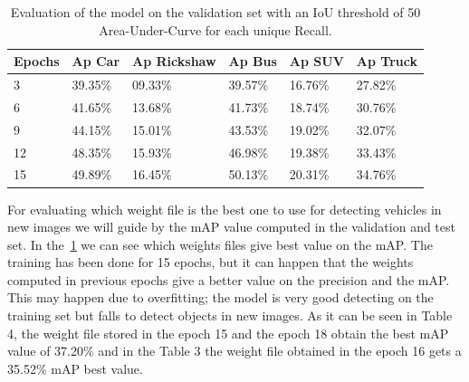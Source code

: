 \begin{table}[!h]
  \centering
  \caption[Evaluation of the model]{Evaluation of the model on the validation set with an IoU threshold of 50%
Area-Under-Curve for each unique Recall. }
  \label{tab:class-ap}
  {\renewcommand{\arraystretch}{1.7}
    \begin{tabular}{p{1.5cm} p{1.5cm} p{1.5cm} p{1.5cm} p{1.5cm} p{1.5cm}}
          \toprule
          Epochs & Ap Car & Ap Rickshaw & Ap  Bus & Ap SUV & Ap Truck \\
          \hline
          3 & 39.35\% & 09.33\% & 39.57\% & 16.76\% & 27.82\% \\
          6 & 41.65\% & 13.68\% & 41.73\% & 18.74\% & 30.76\% \\ 
          9 & 44.15\% & 15.01\% & 43.53\% & 19.02\% & 32.07\% \\
          12 & 48.35\% & 15.93\% & 46.98\% & 19.38\% & 33.43\% \\
          15 & 49.89\% & 16.45\% & 50.13\% & 20.31\% & 34.76\% \\
          \bottomrule
    \end{tabular}
  }
\end{table}

For evaluating which weight file is the best one to use for detecting vehicles in new images we 
will guide by the mAP value computed in the validation and test set. In the~\ref{tab:class-ap} we can 
see which weights files give best value on the mAP. The training has been done for 15 epochs, 
but  it  can  happen  that  the  weights  computed  in  previous  epochs  give  a  better  value  on  the 
precision and the mAP. This may happen due to overfitting; the model is very good detecting on 
the training set but falls to detect objects in new images. As it can be seen in Table 4, the weight 
file  stored in the epoch 15 and the epoch 18 obtain the  best mAP value of 37.20\% and in the 
Table 3 the weight file obtained in the epoch 16 gets a 35.52\% mAP best value.  



